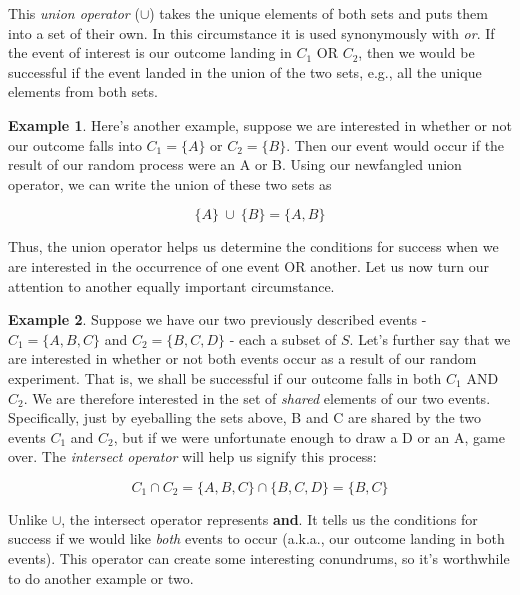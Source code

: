 \documentclass[
]{book}
\theoremstyle{definition}
\theoremstyle{definition}
\newtheorem{example}{Example}[chapter]
\theoremstyle{definition}
\theoremstyle{definition}
\theoremstyle{remark}
\begin{document}
This \emph{union operator} (\(\cup\)) takes the unique elements of both sets and puts them into a set of their own. In this circumstance it is used synonymously with \emph{or}. If the event of interest is our outcome landing in \(C_1\) OR \(C_2\), then we would be successful if the event landed in the union of the two sets, e.g., all the unique elements from both sets.

\begin{example}
Here's another example, suppose we are interested in whether or not our outcome falls into \(C_1 = \{A\}\) or \(C_2 = \{B\}\). Then our event would occur if the result of our random process were an A or B. Using our newfangled union operator, we can write the union of these two sets as

\[ \{A\}\:\cup\:\{B\} = \{A,B\} \]
\end{example}

Thus, the union operator helps us determine the conditions for success when we are interested in the occurrence of one event OR another. Let us now turn our attention to another equally important circumstance.

\begin{example}
Suppose we have our two previously described events - \(C_1 = \{A,B,C\}\) and \(C_2 = \{B,C,D\}\) - each a subset of \(S\). Let's further say that we are interested in whether or not both events occur as a result of our random experiment. That is, we shall be successful if our outcome falls in both \(C_1\) AND \(C_2\). We are therefore interested in the set of \emph{shared} elements of our two events. Specifically, just by eyeballing the sets above, B and C are shared by the two events \(C_1\) and \(C_2\), but if we were unfortunate enough to draw a D or an A, game over. The \emph{intersect operator} will help us signify this process:

\[ C_1 \cap C_2 = \{A,B,C\} \cap \{B,C,D\} = \{B,C\} 
\label{eq:intersect}\]
\end{example}

Unlike \(\cup\), the intersect operator represents \textbf{and}. It tells us the conditions for success if we would like \emph{both} events to occur (a.k.a., our outcome landing in both events). This operator can create some interesting conundrums, so it's worthwhile to do another example or two.
\end{document}
